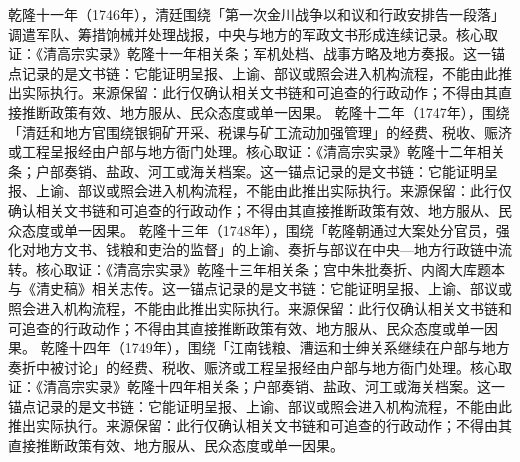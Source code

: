 乾隆十一年（1746年），清廷围绕「第一次金川战争以和议和行政安排告一段落」调遣军队、筹措饷械并处理战报，中央与地方的军政文书形成连续记录。核心取证：《清高宗实录》乾隆十一年相关条；军机处档、战事方略及地方奏报。这一锚点记录的是文书链：它能证明呈报、上谕、部议或照会进入机构流程，不能由此推出实际执行。来源保留：此行仅确认相关文书链和可追查的行政动作；不得由其直接推断政策有效、地方服从、民众态度或单一因果。
乾隆十二年（1747年），围绕「清廷和地方官围绕银铜矿开采、税课与矿工流动加强管理」的经费、税收、赈济或工程呈报经由户部与地方衙门处理。核心取证：《清高宗实录》乾隆十二年相关条；户部奏销、盐政、河工或海关档案。这一锚点记录的是文书链：它能证明呈报、上谕、部议或照会进入机构流程，不能由此推出实际执行。来源保留：此行仅确认相关文书链和可追查的行政动作；不得由其直接推断政策有效、地方服从、民众态度或单一因果。
乾隆十三年（1748年），围绕「乾隆朝通过大案处分官员，强化对地方文书、钱粮和吏治的监督」的上谕、奏折与部议在中央—地方行政链中流转。核心取证：《清高宗实录》乾隆十三年相关条；宫中朱批奏折、内阁大库题本与《清史稿》相关志传。这一锚点记录的是文书链：它能证明呈报、上谕、部议或照会进入机构流程，不能由此推出实际执行。来源保留：此行仅确认相关文书链和可追查的行政动作；不得由其直接推断政策有效、地方服从、民众态度或单一因果。
乾隆十四年（1749年），围绕「江南钱粮、漕运和士绅关系继续在户部与地方奏折中被讨论」的经费、税收、赈济或工程呈报经由户部与地方衙门处理。核心取证：《清高宗实录》乾隆十四年相关条；户部奏销、盐政、河工或海关档案。这一锚点记录的是文书链：它能证明呈报、上谕、部议或照会进入机构流程，不能由此推出实际执行。来源保留：此行仅确认相关文书链和可追查的行政动作；不得由其直接推断政策有效、地方服从、民众态度或单一因果。
